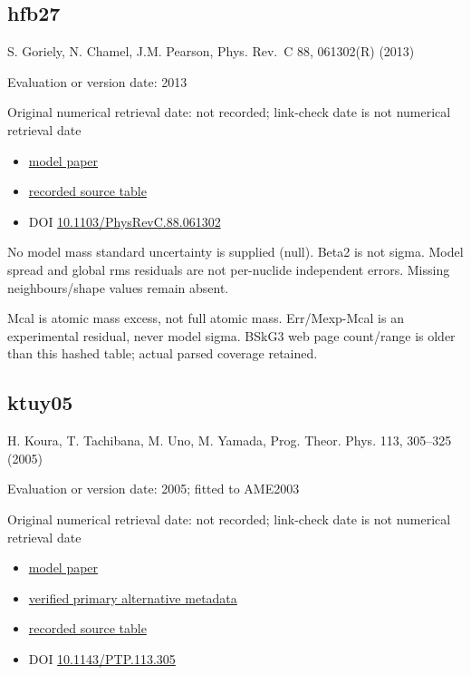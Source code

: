 \documentclass[
  11pt,
  letterpaper,
]{article}
\providecommand{\tightlist}{%
  \setlength{\itemsep}{0pt}\setlength{\parskip}{0pt}}
\begin{document}
\subsection{hfb27}\label{hfb27}

S. Goriely, N. Chamel, J.M. Pearson, Phys. Rev.~C 88, 061302(R) (2013)

Evaluation or version date: 2013

Original numerical retrieval date: not recorded; link-check date is not
numerical retrieval date

\begin{itemize}
\tightlist
\item
  \href{https://doi.org/10.1103/PhysRevC.88.061302}{model paper}
\item
  \href{https://www.astro.ulb.ac.be/bruslib/nucdata/hfb27-dat}{recorded
  source table}
\item
  DOI
  \href{https://doi.org/10.1103/PhysRevC.88.061302}{10.1103/PhysRevC.88.061302}
\end{itemize}

No model mass standard uncertainty is supplied (null). Beta2 is not
sigma. Model spread and global rms residuals are not per-nuclide
independent errors. Missing neighbours/shape values remain absent.

Mcal is atomic mass excess, not full atomic mass. Err/Mexp-Mcal is an
experimental residual, never model sigma. BSkG3 web page count/range is
older than this hashed table; actual parsed coverage retained.

\subsection{ktuy05}\label{ktuy05}

H. Koura, T. Tachibana, M. Uno, M. Yamada, Prog. Theor. Phys. 113,
305--325 (2005)

Evaluation or version date: 2005; fitted to AME2003

Original numerical retrieval date: not recorded; link-check date is not
numerical retrieval date

\begin{itemize}
\tightlist
\item
  \href{https://doi.org/10.1143/PTP.113.305}{model paper}
\item
  \href{https://academic.oup.com/ptp/issue/113/2}{verified primary
  alternative metadata}
\item
  \href{https://wwwndc.jaea.go.jp/nucldata/mass/KTUY05_m246.dat}{recorded
  source table}
\item
  DOI \href{https://doi.org/10.1143/PTP.113.305}{10.1143/PTP.113.305}
\end{itemize}
\end{document}
